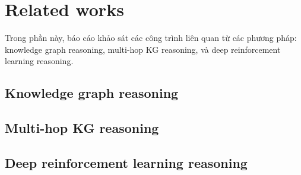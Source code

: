 \section{Related works}
Trong phần này, báo cáo khảo sát các công trình liên quan từ các phương pháp: knowledge graph reasoning, multi-hop KG reasoning, và deep reinforcement learning reasoning.

\subsection{Knowledge graph reasoning}
\lipsum[2]
\lipsum[3]

\subsection{Multi-hop KG reasoning}
\lipsum[2]
\lipsum[3]

\subsection{Deep reinforcement learning reasoning}
\lipsum[2]
\lipsum[3]